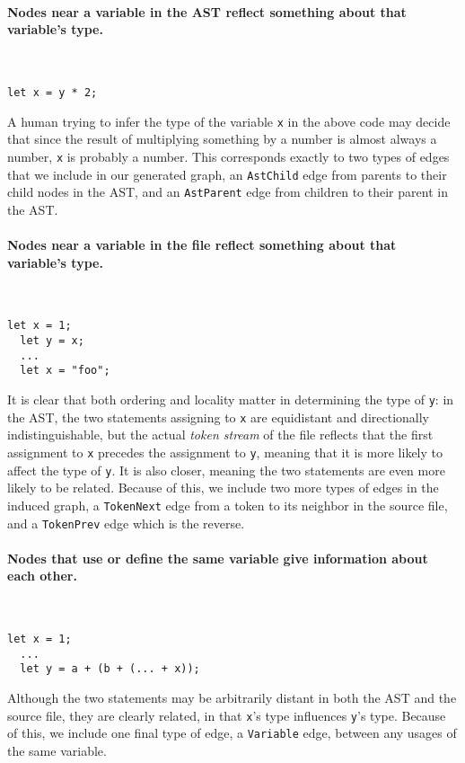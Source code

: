 \paragraph{Nodes near a variable in the AST reflect something about that variable's type.}\
\ %
\begin{lstlisting}[backgroundcolor = \color{white}, frame = single]
  let x = y * 2;
\end{lstlisting}
A human trying to infer the type of the variable \texttt{x} in the above code may decide that since the result of multiplying something by a number is almost always a number, \texttt{x} is probably a number.
This corresponds exactly to two types of edges that we include in our generated graph, an \texttt{AstChild} edge from parents to their child nodes in the AST, and an \texttt{AstParent} edge from children to their parent in the AST.

\par\paragraph{Nodes near a variable in the file reflect something about that variable's type.}
\ %
\begin{lstlisting}[backgroundcolor = \color{white}, frame = single]
  let x = 1;
  let y = x;
  ...
  let x = "foo";
\end{lstlisting}
It is clear that both ordering and locality matter in determining the type of \texttt{y}: in the AST, the two statements assigning to \texttt{x} are equidistant and directionally indistinguishable, but the actual \emph{token stream} of the file reflects that the first assignment to \texttt{x} precedes the assignment to \texttt{y}, meaning that it is more likely to affect the type of \texttt{y}.
It is also closer, meaning the two statements are even more likely to be related.
Because of this, we include two more types of edges in the induced graph, a \texttt{TokenNext} edge from a token to its neighbor in the source file, and a \texttt{TokenPrev} edge which is the reverse.

\paragraph{Nodes that use or define the same variable give information about each other.}
\ %
\begin{lstlisting}[backgroundcolor = \color{white}, frame = single]
  let x = 1;
  ...
  let y = a + (b + (... + x));
\end{lstlisting}
Although the two statements may be arbitrarily distant in both the AST and the source file, they are clearly related, in that \texttt{x}'s type influences \texttt{y}'s type.
Because of this, we include one final type of edge, a \texttt{Variable} edge, between any usages of the same variable.

